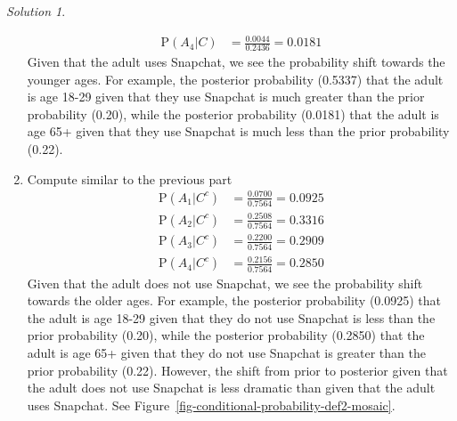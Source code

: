 \documentclass[
  letterpaper,
  DIV=11,
  numbers=noendperiod]{scrreprt}
\theoremstyle{plain}
\theoremstyle{definition}
\theoremstyle{definition}
\theoremstyle{definition}
\theoremstyle{remark}
\newtheorem{refsolution}{Solution}[chapter]
\begin{document}
\begin{tcolorbox}
\begin{refsolution}
\begin{enumerate}
\begin{align*}
  \textrm{P}(A_4|C) & = \frac{0.0044}{0.2436} = 0.0181
  \end{align*} Given that the adult uses Snapchat, we see the
  probability shift towards the younger ages. For example, the posterior
  probability (0.5337) that the adult is age 18-29 given that they use
  Snapchat is much greater than the prior probability (0.20), while the
  posterior probability (0.0181) that the adult is age 65+ given that
  they use Snapchat is much less than the prior probability (0.22).
\item
  Compute similar to the previous part \begin{align*}
  \textrm{P}(A_1|C^c) & = \frac{0.0700}{0.7564} = 0.0925\\
  \textrm{P}(A_2|C^c) & = \frac{0.2508}{0.7564} = 0.3316\\
  \textrm{P}(A_3|C^c) & = \frac{0.2200}{0.7564} = 0.2909\\
  \textrm{P}(A_4|C^c) & = \frac{0.2156}{0.7564} = 0.2850
  \end{align*} Given that the adult does not use Snapchat, we see the
  probability shift towards the older ages. For example, the posterior
  probability (0.0925) that the adult is age 18-29 given that they do
  not use Snapchat is less than the prior probability (0.20), while the
  posterior probability (0.2850) that the adult is age 65+ given that
  they do not use Snapchat is greater than the prior probability (0.22).
  However, the shift from prior to posterior given that the adult does
  not use Snapchat is less dramatic than given that the adult uses
  Snapchat. See Figure~\ref{fig-conditional-probability-def2-mosaic}.
\end{enumerate}

\label{sol-conditional-probability-def2}

\end{refsolution}

\end{tcolorbox}



\end{document}
